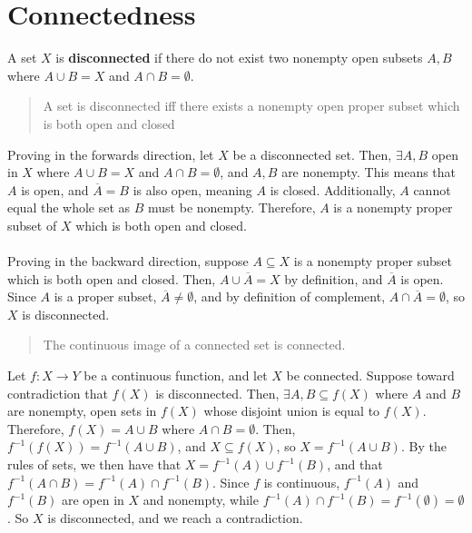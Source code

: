 \documentclass[12pt]{extarticle}
\begin{document}
\section*{Connectedness}%
A set $X$ is \textbf{disconnected} if there do not exist two nonempty open subsets $A,B$ where $A\cup B = X$ and $A\cap B = \emptyset$.
  \begin{quote}
    A set is disconnected iff there exists a nonempty open proper subset which is both open and closed
  \end{quote}
  Proving in the forwards direction, let $X$ be a disconnected set. Then, $\exists A,B$ open in $X$ where $A\cup B= X$ and $A\cap B = \emptyset$, and $A,B$ are nonempty. This means that $A$ is open, and $\overline{A} = B$ is also open, meaning $A$ is closed. Additionally, $A$ cannot equal the whole set as $B$ must be nonempty. Therefore, $A$ is a nonempty proper subset of $X$ which is both open and closed.\\
  \\
Proving in the backward direction, suppose $A\subseteq X$ is a nonempty proper subset which is both open and closed. Then, $A\cup \overline{A} = X$ by definition, and $ \overline{A} $ is open. Since $A$ is a proper subset, $ \overline{A} \neq \emptyset$, and by definition of complement, $A\cap \overline{A} = \emptyset$, so $X$ is disconnected.
  \begin{quote}
    The continuous image of a connected set is connected.
  \end{quote}
Let $f:X\rightarrow Y$ be a continuous function, and let $X$ be connected. Suppose toward contradiction that $f(X)$ is disconnected. Then, $\exists A,B\subseteq f(X)$ where $A$ and $B$ are nonempty, open sets in $f(X)$ whose disjoint union is equal to $f(X)$. Therefore, $f(X) = A\cup B$ where $A\cap B = \emptyset$. Then, $f^{-1}(f(X)) = f^{-1}(A\cup B)$, and $X\subseteq f(X)$, so $X = f^{-1}(A\cup B)$. By the rules of sets, we then have that $X = f^{-1}(A)\cup f^{-1}(B)$, and that $f^{-1}(A\cap B) = f^{-1}(A) \cap f^{-1}(B)$. Since $f$ is continuous, $f^{-1}(A)$ and $f^{-1}(B)$ are open in $X$ and nonempty, while $f^{-1}(A)\cap f^{-1}(B) = f^{-1}(\emptyset) = \emptyset$. So $X$ is disconnected, and we reach a contradiction.
\end{document}
